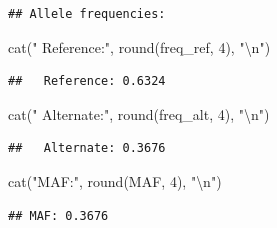 \documentclass[
]{article}
\newenvironment{Shaded}{\begin{snugshade}}{\end{snugshade}}
\newcommand{\DecValTok}[1]{\textcolor[rgb]{0.00,0.00,0.81}{#1}}
\newcommand{\FunctionTok}[1]{\textcolor[rgb]{0.00,0.00,0.00}{#1}}
\newcommand{\NormalTok}[1]{#1}
\newcommand{\SpecialCharTok}[1]{\textcolor[rgb]{0.00,0.00,0.00}{#1}}
\newcommand{\StringTok}[1]{\textcolor[rgb]{0.31,0.60,0.02}{#1}}
\begin{document}
\begin{verbatim}
## Allele frequencies:
\end{verbatim}

\begin{Shaded}
\begin{Highlighting}[]
\FunctionTok{cat}\NormalTok{(}\StringTok{"  Reference:"}\NormalTok{, }\FunctionTok{round}\NormalTok{(freq\_ref, }\DecValTok{4}\NormalTok{), }\StringTok{"}\SpecialCharTok{\textbackslash{}n}\StringTok{"}\NormalTok{)}
\end{Highlighting}
\end{Shaded}

\begin{verbatim}
##   Reference: 0.6324
\end{verbatim}

\begin{Shaded}
\begin{Highlighting}[]
\FunctionTok{cat}\NormalTok{(}\StringTok{"  Alternate:"}\NormalTok{, }\FunctionTok{round}\NormalTok{(freq\_alt, }\DecValTok{4}\NormalTok{), }\StringTok{"}\SpecialCharTok{\textbackslash{}n}\StringTok{"}\NormalTok{)}
\end{Highlighting}
\end{Shaded}

\begin{verbatim}
##   Alternate: 0.3676
\end{verbatim}

\begin{Shaded}
\begin{Highlighting}[]
\FunctionTok{cat}\NormalTok{(}\StringTok{"MAF:"}\NormalTok{, }\FunctionTok{round}\NormalTok{(MAF, }\DecValTok{4}\NormalTok{), }\StringTok{"}\SpecialCharTok{\textbackslash{}n}\StringTok{"}\NormalTok{)}
\end{Highlighting}
\end{Shaded}

\begin{verbatim}
## MAF: 0.3676
\end{verbatim}
\end{document}
